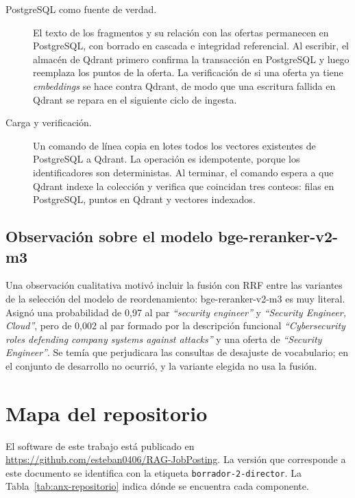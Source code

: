 \begin{description}
    \item[PostgreSQL como fuente de verdad.] El texto de los fragmentos y su relación con las ofertas permanecen en PostgreSQL, con borrado en cascada e integridad referencial. Al escribir, el almacén de Qdrant primero confirma la transacción en PostgreSQL y luego reemplaza los puntos de la oferta. La verificación de si una oferta ya tiene \textit{embeddings} se hace contra Qdrant, de modo que una escritura fallida en Qdrant se repara en el siguiente ciclo de ingesta.
    \item[Carga y verificación.] Un comando de línea copia en lotes todos los vectores existentes de PostgreSQL a Qdrant. La operación es idempotente, porque los identificadores son deterministas. Al terminar, el comando espera a que Qdrant indexe la colección y verifica que coincidan tres conteos: filas en PostgreSQL, puntos en Qdrant y vectores indexados.
\end{description}

\section{Observación sobre el modelo bge-reranker-v2-m3}

Una observación cualitativa motivó incluir la fusión con RRF entre las variantes de la selección del modelo de reordenamiento: bge-reranker-v2-m3 es muy literal. Asignó una probabilidad de 0,97 al par \textit{\enquote{security engineer}} y \textit{\enquote{Security Engineer, Cloud}}, pero de 0,002 al par formado por la descripción funcional \textit{\enquote{Cybersecurity roles defending company systems against attacks}} y una oferta de \textit{\enquote{Security Engineer}}. Se temía que perjudicara las consultas de desajuste de vocabulario; en el conjunto de desarrollo no ocurrió, y la variante elegida no usa la fusión.

\chapter{Mapa del repositorio}
\label{anx:repositorio}

El software de este trabajo está publicado en \url{https://github.com/esteban0406/RAG-JobPosting}. La versión que corresponde a este documento se identifica con la etiqueta \texttt{borrador-2-director}. La Tabla~\ref{tab:anx-repositorio} indica dónde se encuentra cada componente.

